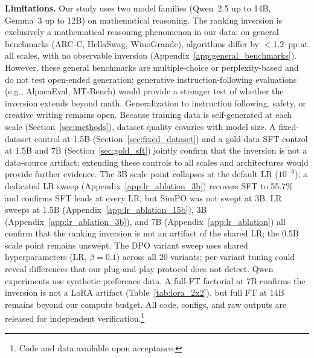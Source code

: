 \documentclass{article}
\begin{document}
\textbf{Limitations.}
Our study uses two model families (Qwen~2.5 up to 14B, Gemma~3 up to 12B) on mathematical reasoning. The ranking inversion is exclusively a mathematical reasoning phenomenon in our data: on general benchmarks (ARC-C, HellaSwag, WinoGrande), algorithms differ by $<$1.2~pp at all scales, with no observable inversion (Appendix~\ref{app:general_benchmarks}). However, these general benchmarks are multiple-choice or perplexity-based and do not test open-ended generation; generative instruction-following evaluations (e.g., AlpacaEval, MT-Bench) would provide a stronger test of whether the inversion extends beyond math. Generalization to instruction following, safety, or creative writing remains open. Because training data is self-generated at each scale (Section~\ref{sec:methods}), dataset quality covaries with model size. A fixed-dataset control at 1.5B (Section~\ref{sec:fixed_dataset}) and a gold-data SFT control at 1.5B and 7B (Section~\ref{sec:gold_sft}) jointly confirm that the inversion is not a data-source artifact; extending these controls to all scales and architectures would provide further evidence. The 3B scale point collapses at the default LR ($10^{-6}$); a dedicated LR sweep (Appendix~\ref{app:lr_ablation_3b}) recovers SFT to 55.7\% and confirms SFT leads at every LR, but SimPO was not swept at 3B. LR sweeps at 1.5B (Appendix~\ref{app:lr_ablation_15b}), 3B (Appendix~\ref{app:lr_ablation_3b}), and 7B (Appendix~\ref{app:lr_ablation}) all confirm that the ranking inversion is not an artifact of the shared LR; the 0.5B scale point remains unswept. The DPO variant sweep uses shared hyperparameters (LR, $\beta=0.1$) across all 20 variants; per-variant tuning could reveal differences that our plug-and-play protocol does not detect. Qwen experiments use synthetic preference data. A full-FT factorial at 7B confirms the inversion is not a LoRA artifact (Table~\ref{tab:lora_2x2}), but full FT at 14B remains beyond our compute budget. All code, configs, and raw outputs are released for independent verification.\footnote{Code and data available upon acceptance.}
\end{document}
